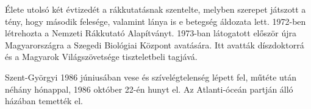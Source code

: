 \documentclass[10pt, conference,a4paper]{ITKproc}
\begin{document}
Élete utolsó két évtizedét a rákkutatásnak szentelte, melyben szerepet játszott a tény, hogy második felesége, valamint lánya is e betegség áldozata lett. 1972-ben létrehozta a Nemzeti Rákkutató Alapítványt. 1973-ban látogatott először újra Magyarországra a Szegedi Biológiai Központ avatására. Itt avatták díszdoktorrá és a Magyarok Világszövetsége tiszteletbeli tagjává. 

Szent-Györgyi 1986 júniusában vese és szívelégtelenség lépett fel, műtéte után néhány hónappal, 1986 október 22-én hunyt el. Az Atlanti-óceán partján álló házában temették el. 









%


\end{document}
